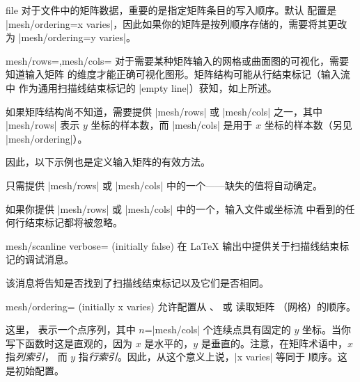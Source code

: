 {\begin{addplot3operation}[]{file}{}
    对于文件中的矩阵数据，重要的是指定矩阵条目的写入顺序。默认
    配置是 |mesh/ordering=x varies|，因此如果你的矩阵是按列顺序存储的，需要将其更改为
    |mesh/ordering=y varies|。
\end{addplot3operation}

\begin{pgfplotskeylist}{mesh/rows=,mesh/cols=}
    对于需要某种矩阵输入的网格或曲面图的可视化，需要知道输入矩阵
    的维度才能正确可视化图形。矩阵结构可能从行结束标记（输入流中
    作为通用扫描线结束标记的 |empty line|）获知，如上所述。

    如果矩阵结构尚不知道，需要提供 |mesh/rows| 或 |mesh/cols|
    之一，其中 |mesh/rows| 表示 $y$ 坐标的样本数，而 |mesh/cols|
    是用于 $x$ 坐标的样本数（另见 |mesh/ordering|）。

    因此，以下示例也是定义输入矩阵的有效方法。
\begin{codeexample}[]
\end{codeexample}
    只需提供 |mesh/rows| 或 |mesh/cols| 中的一个——缺失的值将自动确定。

    如果你提供 |mesh/rows| 或 |mesh/cols| 中的一个，输入文件或坐标流
    中看到的任何行结束标记都将被忽略。
\end{pgfplotskeylist}

\begin{pgfplotskeylist}{mesh/scanline verbose= (initially false)}
    在 \LaTeX{} 输出中提供关于扫描线结束标记的调试消息。

    该消息将告知是否找到了扫描线结束标记以及它们是否相同。
\end{pgfplotskeylist}

\begin{pgfplotskey}{mesh/ordering= (initially x varies)}
    允许配置从 、
     或  读取矩阵
    （网格）的顺序。

    这里， 表示一个点序列，其中 $n$=|mesh/cols|
    个连续点具有固定的 $y$ 坐标。当你写下函数时这是直观的，因为 $x$
    是水平的，$y$ 是垂直的。注意，在矩阵术语中，$x$ 指\emph{列索引}，
    而 $y$ 指\emph{行索引}。因此，从这个意义上说，|x varies| 等同于
     顺序。这是初始配置。


\end{pgfplotskey}}
